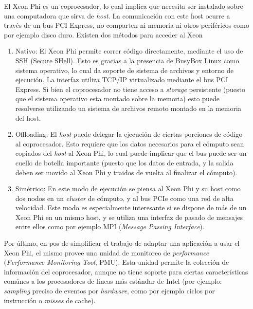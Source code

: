 El Xeon Phi es un coprocesador, lo cual implica que necesita ser instalado sobre una computadora que sirva de \textit{host}. La comunicaci\'on con este host
ocurre a trav\'es de un bus PCI Express, no comparten ni memoria ni otros perif\'ericos como por ejemplo disco duro. Existen dos m\'etodos para acceder al Xeon~\cite{BookXeonPhi}

\begin{enumerate}
    \item Nativo: El Xeon Phi permite correr c\'odigo directamente, mediante el uso de SSH (Secure SHell). Esto es gracias a la presencia de BusyBox Linux como sistema operativo,
    lo cual da soporte de sistema de archivos y entorno de ejecuci\'on. La interfaz utiliza TCP/IP virtualizado mediante el bus PCI Express. Si bien el coprocesador no tiene acceso a \textit{storage} persistente (puesto que el sistema operativo esta montado sobre la memoria) esto puede resolverse utilizando un sistema de archivos remoto montado en la memoria del host.
    \item Offloading: El \textit{host} puede delegar la ejecuci\'on de ciertas porciones de c\'odigo al coprocesador. Esto requiere que los datos necesarios para el c\'omputo sean copiados del \textit{host} al Xeon Phi, lo cual puede implicar que el bus puede ser un cuello de botella importante (puesto que los datos de entrada, y la salida deben ser movido al Xeon Phi y traidos de vuelta al finalizar el c\'omputo).
    \item Simétrico: En este modo de ejecuci\'on se piensa al Xeon Phi y su host como dos nodos en un \textit{cluster} de c\'omputo, y al bus PCIe como una red de alta velocidad.
Este modo es especialmente interesante si se dispone de m\'as de un Xeon Phi en un mismo host, y se utiliza una interfaz de pasado de mensajes entre ellos como por ejemplo MPI (\textit{Message Passing Interface}).
\end{enumerate}

Por \'ultimo, en pos de simplificar el trabajo de adaptar una aplicaci\'on a usar el Xeon Phi, el mismo provee una unidad de monitoreo de \textit{performance} (\textit{Performance
Monitoring Tool}, PMU). Esta unidad permite la colecci\'on de informaci\'on del coprocesador, aunque no tiene soporte para ciertas caracter\'isticas com\'unes a los procesadores
de lineas m\'as est\'andar de Intel (por ejemplo: \textit{sampling} preciso de eventos por \textit{hardware}, como por ejemplo ciclos por instrucci\'on o \textit{misses} de cache).



